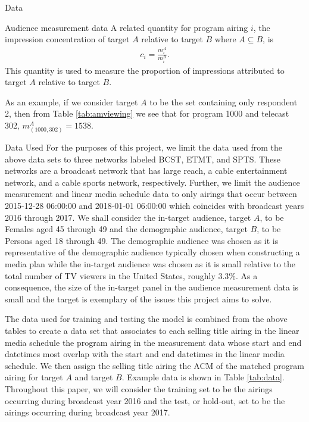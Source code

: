 \begin{chapter}{Data}
\begin{section}{Audience measurement data}
  A related quantity for program airing $i$, the impression concentration of target $A$ relative to target $B$ where $A \subseteq B$, is
  \begin{align*}
    c_i = \frac{m_{i}^A}{m_{i}^B}.
  \end{align*}
  This quantity is used to measure the proportion of impressions attributed to target $A$ relative to target $B$.

  As an example, if we consider target $A$ to be the set containing only respondent 2, then
  from Table \ref{tab:amviewing} we see that for program 1000 and telecast 302, $m_{(1000, 302)}^A = 1538$.
\end{section}

\begin{section}{Data Used}\label{data:used}
  For the purposes of this project, we limit the data used from the above data sets
  to three networks labeled BCST, ETMT, and SPTS. These networks are a broadcast network
  that has large reach, a cable entertainment network, and a cable sports network, respectively.
  Further, we limit the audience measurement and linear media schedule data to only airings that occur
  between 2015-12-28 06:00:00 and 2018-01-01 06:00:00 which coincides with broadcast years 2016 through 2017.
  We shall consider the in-target audience, target $A$, to be Females aged 45 through 49 and the demographic audience, target $B$,
  to be Persons aged 18 through 49. The demographic audience was chosen as it is representative
  of the demographic audience typically chosen when constructing a media plan while the in-target
  audience was chosen as it is small relative to the total number of TV viewers in the United States, roughly 3.3\%.
  As a consequence, the size of the in-target panel in the audience measurement data is small and the target is
  exemplary of the issues this project aims to solve.

  The data used for training and testing the model is combined from the above tables to create a
  data set that associates to each selling title airing in the linear media schedule the program airing in the measurement data whose start and end datetimes
  most overlap with the start and end datetimes in the linear media schedule. We then assign
  the selling title airing the ACM of the matched program airing for target $A$ and target $B$.
  Example data is shown in Table \ref{tab:data}. Throughout this paper, we will consider the training set
  to be the airings occurring during broadcast year 2016 and the test, or hold-out, set to
  be the airings occurring during broadcast year 2017.


\end{section}
\end{chapter}

